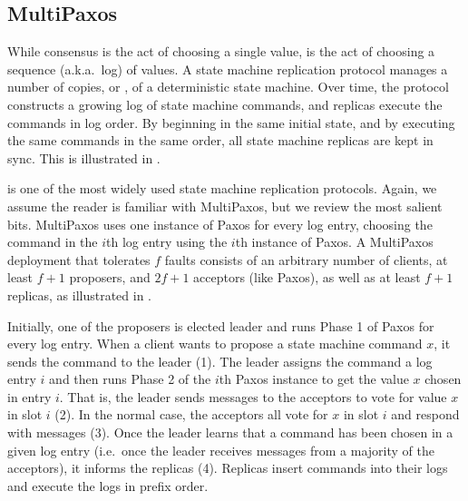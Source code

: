 {}


\subsection{MultiPaxos}
While consensus is the act of choosing a single value,  is the act of choosing a sequence (a.k.a.\ log) of values. A state
machine replication protocol manages a number of copies, or ,
of a deterministic state machine. Over time, the protocol constructs a growing
log of state machine commands, and replicas execute the commands in log
order.  By beginning in the same initial state, and by executing the same
commands in the same order, all state machine replicas are kept in sync. This
is illustrated in .

{}

 is one of the most widely used state machine replication
protocols. Again, we assume the reader is familiar with MultiPaxos, but we
review the most salient bits.
%
MultiPaxos uses one instance of Paxos for every log entry, choosing the command
in the $i$th log entry using the $i$th instance of Paxos.
%
A MultiPaxos deployment that tolerates $f$ faults consists of an arbitrary
number of clients, at least $f+1$ proposers, and $2f+1$ acceptors (like Paxos),
as well as at least $f+1$ replicas, as illustrated in
.

{}

Initially, one of the proposers is elected leader and runs Phase 1 of Paxos for
every log entry. When a client wants to propose a state machine command
$x$, it sends the command to the leader (1). The leader assigns the command a
log entry $i$ and then runs Phase 2 of the $i$th Paxos instance to get the
value $x$ chosen in entry $i$. That is, the leader sends 
messages to the acceptors to vote for value $x$ in slot $i$ (2). In the normal
case, the acceptors all vote for $x$ in slot $i$ and respond with
 messages (3). Once the leader learns that a command has
been chosen in a given log entry (i.e.\ once the leader receives
 messages from a majority of the acceptors), it informs the
replicas (4). Replicas insert commands into their logs and execute the logs in
prefix order.

